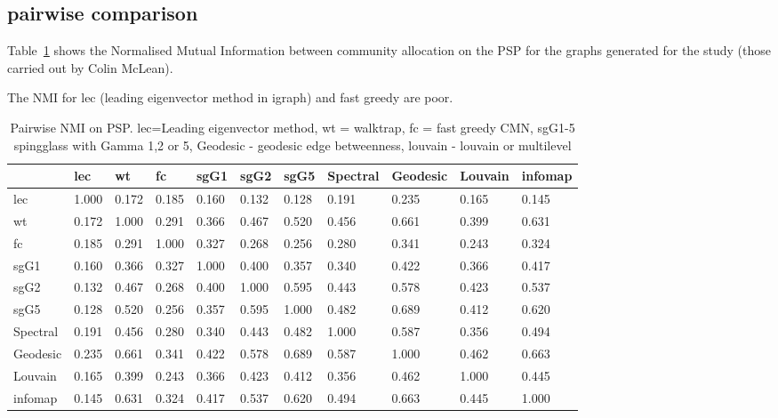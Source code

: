 
 
\subsection{pairwise comparison}

Table~\ref{tab:pairwise NMI on PSP} shows the Normalised Mutual Information between community allocation on the PSP for the graphs generated for the study (those carried out by Colin McLean). 

The NMI for lec (leading eigenvector method in igraph) and fast greedy are poor. 

\begin{table}[ht]
\centering
\begin{adjustbox}{width=\textwidth}

\setlength{\extrarowheight}{2pt}
\begin{tabular}{lllllllllll}
  \toprule
& lec & wt & fc & sgG1 & sgG2 & sgG5 & Spectral & Geodesic & Louvain & infomap \\ 
  \midrule
lec & 1.000 & 0.172 & 0.185 & 0.160 & 0.132 & 0.128 & 0.191 & 0.235 & 0.165 & 0.145 \\ 
  wt & 0.172 & 1.000 & 0.291 & 0.366 & 0.467 & 0.520 & 0.456 & 0.661 & 0.399 & 0.631 \\ 
  fc & 0.185 & 0.291 & 1.000 & 0.327 & 0.268 & 0.256 & 0.280 & 0.341 & 0.243 & 0.324 \\ 
  sgG1 & 0.160 & 0.366 & 0.327 & 1.000 & 0.400 & 0.357 & 0.340 & 0.422 & 0.366 & 0.417 \\ 
  sgG2 & 0.132 & 0.467 & 0.268 & 0.400 & 1.000 & 0.595 & 0.443 & 0.578 & 0.423 & 0.537 \\ 
  sgG5 & 0.128 & 0.520 & 0.256 & 0.357 & 0.595 & 1.000 & 0.482 & 0.689 & 0.412 & 0.620 \\ 
  Spectral & 0.191 & 0.456 & 0.280 & 0.340 & 0.443 & 0.482 & 1.000 & 0.587 & 0.356 & 0.494 \\ 
  Geodesic & 0.235 & 0.661 & 0.341 & 0.422 & 0.578 & 0.689 & 0.587 & 1.000 & 0.462 & 0.663 \\ 
  Louvain & 0.165 & 0.399 & 0.243 & 0.366 & 0.423 & 0.412 & 0.356 & 0.462 & 1.000 & 0.445 \\ 
  infomap & 0.145 & 0.631 & 0.324 & 0.417 & 0.537 & 0.620 & 0.494 & 0.663 & 0.445 & 1.000 \\ 
   \bottomrule
\end{tabular}
\end{adjustbox}
\caption[Pairwise NMI for clustering algorithms on PSP]{Pairwise NMI on PSP. lec=Leading eigenvector method, wt = walktrap, fc = fast greedy CMN, sgG1-5 spingglass with Gamma 1,2 or 5, Geodesic - geodesic edge betweenness, louvain - louvain or multilevel} 
\label{tab:pairwise NMI on PSP}
\end{table}


